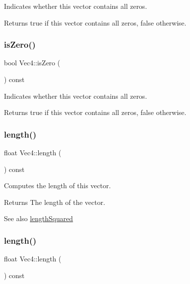 Indicates whether this vector contains all zeros.

\begin{DoxyReturn}{Returns}
true if this vector contains all zeros, false otherwise. 
\end{DoxyReturn}
\mbox{\label{classVec4_a4736299b9772b67d32f3ca2ef45f39ad}} 
\subsubsection{\texorpdfstring{is\+Zero()}{isZero()}\hspace{0.1cm}{\footnotesize\ttfamily [2/2]}}
{\footnotesize\ttfamily bool Vec4\+::is\+Zero (\begin{DoxyParamCaption}{ }\end{DoxyParamCaption}) const}

Indicates whether this vector contains all zeros.

\begin{DoxyReturn}{Returns}
true if this vector contains all zeros, false otherwise. 
\end{DoxyReturn}
\mbox{\label{classVec4_ac42249851a68eaf15815285b76763058}} 
\subsubsection{\texorpdfstring{length()}{length()}\hspace{0.1cm}{\footnotesize\ttfamily [1/2]}}
{\footnotesize\ttfamily float Vec4\+::length (\begin{DoxyParamCaption}{ }\end{DoxyParamCaption}) const}

Computes the length of this vector.

\begin{DoxyReturn}{Returns}
The length of the vector.
\end{DoxyReturn}
\begin{DoxySeeAlso}{See also}
\hyperlink{classVec4_a06243f2009024c79f544c99acf621e53}{length\+Squared} 
\end{DoxySeeAlso}
\mbox{\label{classVec4_ac42249851a68eaf15815285b76763058}} 
\subsubsection{\texorpdfstring{length()}{length()}\hspace{0.1cm}{\footnotesize\ttfamily [2/2]}}
{\footnotesize\ttfamily float Vec4\+::length (\begin{DoxyParamCaption}{ }\end{DoxyParamCaption}) const}

